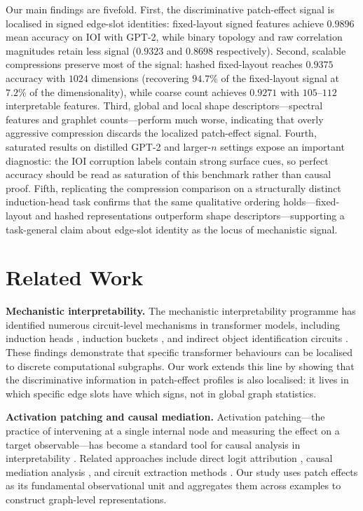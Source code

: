 \documentclass[11pt,a4paper]{article}
\begin{document}
Our main findings are fivefold. First, the discriminative patch-effect signal is localised in signed edge-slot identities: fixed-layout signed features achieve $0.9896$ mean accuracy on IOI with GPT-2, while binary topology and raw correlation magnitudes retain less signal ($0.9323$ and $0.8698$ respectively). Second, scalable compressions preserve most of the signal: hashed fixed-layout reaches $0.9375$ accuracy with $1024$ dimensions (recovering $94.7\%$ of the fixed-layout signal at $7.2\%$ of the dimensionality), while coarse count achieves $0.9271$ with $105$--$112$ interpretable features. Third, global and local shape descriptors---spectral features and graphlet counts---perform much worse, indicating that overly aggressive compression discards the localized patch-effect signal. Fourth, saturated results on distilled GPT-2 and larger-$n$ settings expose an important diagnostic: the IOI corruption labels contain strong surface cues, so perfect accuracy should be read as saturation of this benchmark rather than causal proof. Fifth, replicating the compression comparison on a structurally distinct induction-head task confirms that the same qualitative ordering holds---fixed-layout and hashed representations outperform shape descriptors---supporting a task-general claim about edge-slot identity as the locus of mechanistic signal.

\section{Related Work}

\textbf{Mechanistic interpretability.} The mechanistic interpretability programme has identified numerous circuit-level mechanisms in transformer models, including induction heads \cite{turpin2023algorithmic}, induction buckets \cite{park2023causal}, and indirect object identification circuits \cite{li2023causal, nanda2023attribution}. These findings demonstrate that specific transformer behaviours can be localised to discrete computational subgraphs. Our work extends this line by showing that the discriminative information in patch-effect profiles is also localised: it lives in which specific edge slots have which signs, not in global graph statistics.

\textbf{Activation patching and causal mediation.} Activation patching---the practice of intervening at a single internal node and measuring the effect on a target observable---has become a standard tool for causal analysis in interpretability \cite{narang2022causal, wang2023localizing}. Related approaches include direct logit attribution \cite{turner2023block}, causal mediation analysis \cite{pearl2009causality}, and circuit extraction methods \cite{hanna2023text}. Our study uses patch effects as its fundamental observational unit and aggregates them across examples to construct graph-level representations.
\end{document}
